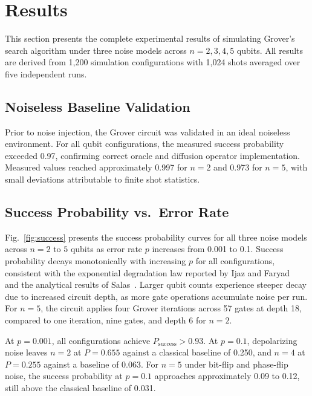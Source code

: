 \documentclass[conference]{IEEEtran}
\begin{document}
\section{Results}

This section presents the complete experimental results of simulating Grover's
search algorithm under three noise models across $n = 2, 3, 4, 5$ qubits. All
results are derived from 1{,}200 simulation configurations with 1{,}024 shots
averaged over five independent runs.

\subsection{Noiseless Baseline Validation}

Prior to noise injection, the Grover circuit was validated in an ideal noiseless
environment. For all qubit configurations, the measured success probability exceeded
0.97, confirming correct oracle and diffusion operator implementation. Measured
values reached approximately 0.997 for $n=2$ and 0.973 for $n=5$, with small
deviations attributable to finite shot statistics.

\subsection{Success Probability vs.\ Error Rate}

Fig.~\ref{fig:success} presents the success probability curves for all three noise
models across $n = 2$ to $5$ qubits as error rate $p$ increases from 0.001 to 0.1.
Success probability decays monotonically with increasing $p$ for all configurations,
consistent with the exponential degradation law reported by Ijaz and Faryad~\cite{ijaz2023}
and the analytical results of Salas~\cite{salas2008}. Larger qubit counts experience
steeper decay due to increased circuit depth, as more gate operations accumulate noise
per run. For $n=5$, the circuit applies four Grover iterations across 57 gates at
depth 18, compared to one iteration, nine gates, and depth 6 for $n=2$.

At $p = 0.001$, all configurations achieve $P_{\text{success}} > 0.93$. At $p = 0.1$,
depolarizing noise leaves $n=2$ at $P = 0.655$ against a classical baseline of 0.250,
and $n=4$ at $P = 0.255$ against a baseline of 0.063. For $n=5$ under bit-flip and
phase-flip noise, the success probability at $p = 0.1$ approaches approximately 0.09
to 0.12, still above the classical baseline of 0.031.
\end{document}
